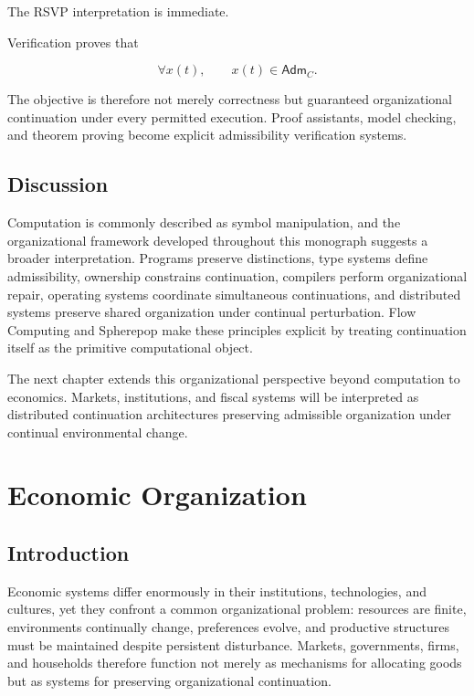 \documentclass[11pt,oneside]{book}
\numberwithin{equation}{chapter}
\theoremstyle{definition}
\theoremstyle{plain}
\newcommand{\Adm}{\mathsf{Adm}}
\begin{document}
The RSVP interpretation is immediate.

Verification proves that

\[
\forall
x(t),
\qquad
x(t)
\in
\Adm_C.
\]

The objective is therefore not merely correctness but guaranteed organizational continuation under every permitted execution. Proof assistants, model checking, and theorem proving become explicit admissibility verification systems.

\section{Discussion}

Computation is commonly described as symbol manipulation, and the organizational framework developed throughout this monograph suggests a broader interpretation. Programs preserve distinctions, type systems define admissibility, ownership constrains continuation, compilers perform organizational repair, operating systems coordinate simultaneous continuations, and distributed systems preserve shared organization under continual perturbation. Flow Computing and Spherepop make these principles explicit by treating continuation itself as the primitive computational object.

The next chapter extends this organizational perspective beyond computation to economics. Markets, institutions, and fiscal systems will be interpreted as distributed continuation architectures preserving admissible organization under continual environmental change.

\chapter{Economic Organization}

\section{Introduction}

Economic systems differ enormously in their institutions, technologies, and cultures, yet they confront a common organizational problem: resources are finite, environments continually change, preferences evolve, and productive structures must be maintained despite persistent disturbance. Markets, governments, firms, and households therefore function not merely as mechanisms for allocating goods but as systems for preserving organizational continuation.
\end{document}
